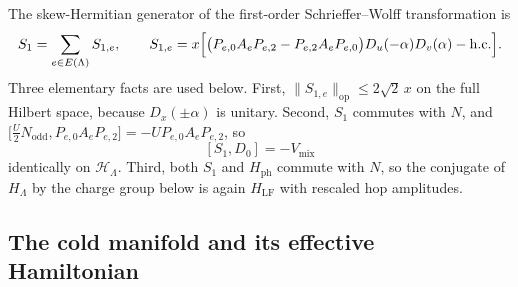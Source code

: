 \documentclass[11pt]{article}
\theoremstyle{plain}
\theoremstyle{definition}
\newcommand{\Nodd}{N_{\mathrm{odd}}}
\begin{document}
The skew-Hermitian generator of the first-order Schrieffer--Wolff
transformation is
\begin{equation}\label{eq:S1}
S_1=\sum_{e\in E(\Lambda)}S_{1,e},\qquad
S_{1,e}=x\Bigl[\bigl(P_{e,0}A_eP_{e,2}-P_{e,2}A_eP_{e,0}\bigr)D_u(-\alpha)D_v(\alpha)-\mathrm{h.c.}\Bigr].
\end{equation}
Three elementary facts are used below. First,
$\|S_{1,e}\|_{\mathrm{op}}\le2\sqrt{2}\,x$ on the full Hilbert space, because
$D_x(\pm\alpha)$ is unitary. Second, $S_1$ commutes with $N$, and
$\bigl[\tfrac{U}{2}\Nodd,P_{e,0}A_eP_{e,2}\bigr]=-UP_{e,0}A_eP_{e,2}$, so
\begin{equation}\label{eq:cancel}
[S_1,D_0]=-V_{\mathrm{mix}}
\end{equation}
identically on $\mathcal{H}_\Lambda$. Third, both $S_1$ and $H_{\mathrm{ph}}$
commute with $N$, so the conjugate of $H_\Lambda$ by the charge group below is
again $H_{\mathrm{LF}}$ with rescaled hop amplitudes.

\subsection{The cold manifold and its effective Hamiltonian}\label{sec:cold}
\end{document}

